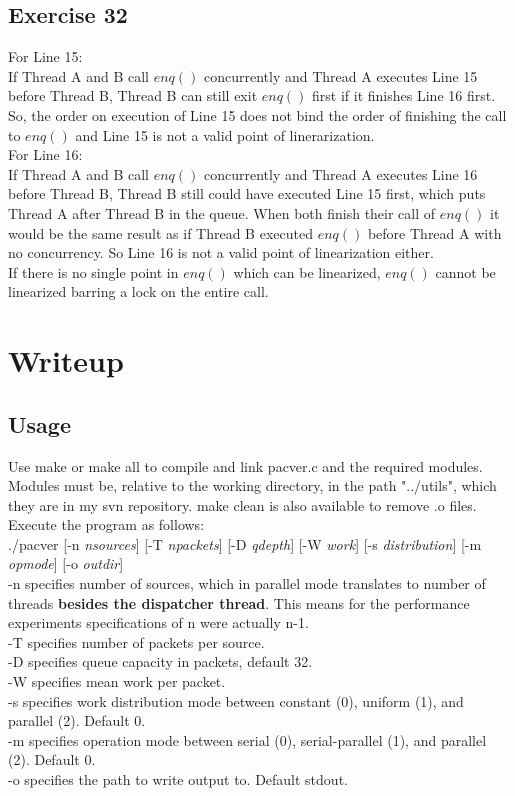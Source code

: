 \documentclass{article}
\begin{document}
\begin{adjustwidth}{-2cm}{-2cm}
\subsection{Exercise 32}
For Line 15:\\
If Thread A and B call $enq()$ concurrently and Thread A executes Line 15 before Thread B, Thread B can still exit $enq()$ first if it finishes Line 16 first. So, the order on execution of Line 15 does not bind the order of finishing the call to $enq()$ and Line 15 is not a valid point of linerarization.\\
For Line 16:\\
If Thread A and B call $enq()$ concurrently and Thread A executes Line 16 before Thread B, Thread B still could have executed Line 15 first, which puts Thread A after Thread B in the queue. When both finish their call of $enq()$ it would be the same result as if Thread B executed $enq()$ before Thread A with no concurrency. So Line 16 is not a valid point of linearization either.\\
If there is no single point in $enq()$ which can be linearized, $enq()$ cannot be linearized barring a lock on the entire call.

\section{Writeup}
\subsection{Usage}
Use make or make all to compile and link pacver.c and the required modules. Modules must be, relative to the working directory, in the path "../utils", which they are in my svn repository. make clean is also available to remove .o files.\\
Execute the program as follows:\\
./pacver [-n \textit{nsources}] [-T \textit{npackets}] [-D \textit{qdepth}] [-W \textit{work}] [-s \textit{distribution}] [-m \textit{opmode}] [-o \textit{outdir}]\\
-n specifies number of sources, which in parallel mode translates to number of threads \textbf{besides the dispatcher thread}. This means for the performance experiments specifications of n were actually n-1.\\
-T specifies number of packets per source.\\
-D specifies queue capacity in packets, default 32.\\
-W specifies mean work per packet.\\
-s specifies work distribution mode between constant (0), uniform (1), and parallel (2). Default 0.\\
-m specifies operation mode between serial (0), serial-parallel (1), and parallel (2). Default 0.\\
-o specifies the path to write output to. Default stdout.

\end{adjustwidth}
\end{document}

